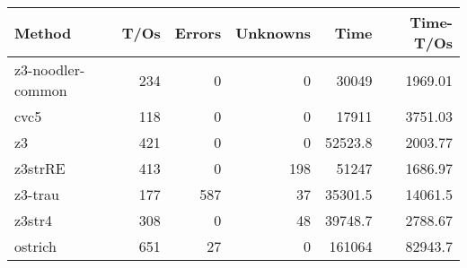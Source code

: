 \begin{tabular}{lrrrrr}
\hline
 Method            &   T/Os &   Errors &   Unknowns &     Time &   Time-T/Os \\
\hline
 z3-noodler-common &    234 &        0 &          0 &  30049   &     1969.01 \\
 cvc5              &    118 &        0 &          0 &  17911   &     3751.03 \\
 z3                &    421 &        0 &          0 &  52523.8 &     2003.77 \\
 z3strRE           &    413 &        0 &        198 &  51247   &     1686.97 \\
 z3-trau           &    177 &      587 &         37 &  35301.5 &    14061.5  \\
 z3str4            &    308 &        0 &         48 &  39748.7 &     2788.67 \\
 ostrich           &    651 &       27 &          0 & 161064   &    82943.7  \\
\hline
\end{tabular}
